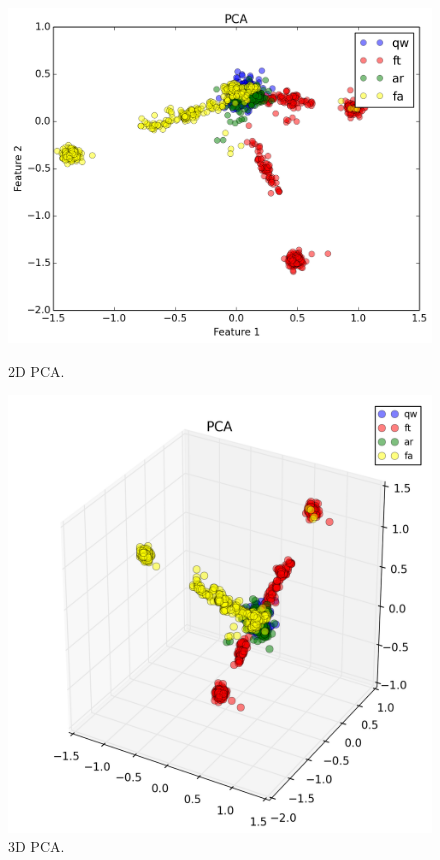 \begin{figure}
\centering
\begin{minipage}{.23\textwidth}
\includegraphics[width=1\textwidth]{img/easy_pca_2d}
\caption{2D PCA.}
\label{fig:2d_pca}
\end{minipage}
\begin{minipage}{.23\textwidth}
\includegraphics[width=1\textwidth]{img/easy_pca_3d}
\caption{3D PCA.}
\label{fig:3d_pca}
\end{minipage}
\end{figure}

